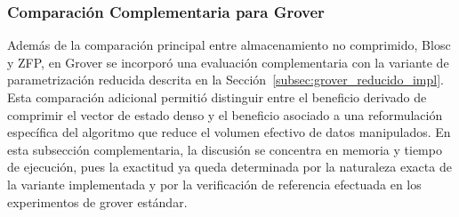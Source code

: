 \subsubsection{Comparación Complementaria para Grover}

Además de la comparación principal entre almacenamiento no comprimido, Blosc y ZFP, en Grover se incorporó una evaluación complementaria con la variante de parametrización reducida descrita en la Sección~\ref{subsec:grover_reducido_impl}. Esta comparación adicional permitió distinguir entre el beneficio derivado de comprimir el vector de estado denso y el beneficio asociado a una reformulación específica del algoritmo que reduce el volumen efectivo de datos manipulados. En esta subsección complementaria, la discusión se concentra en memoria y tiempo de ejecución, pues la exactitud ya queda determinada por la naturaleza exacta de la variante implementada y por la verificación de referencia efectuada en los experimentos de grover estándar.
